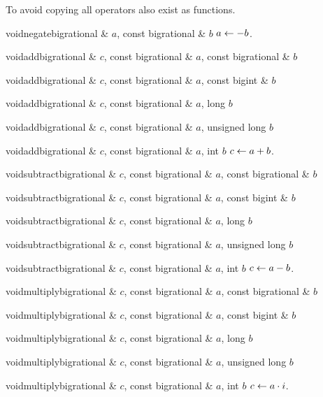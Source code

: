 To avoid copying all operators also exist as functions.

\begin{fcode}{void}{negate}{bigrational & $a$, const bigrational & $b$}
  $a \leftarrow -b$.
\end{fcode}

\begin{fcode}{void}{add}{bigrational & $c$, const bigrational & $a$, const bigrational & $b$}\end{fcode}
\begin{fcode}{void}{add}{bigrational & $c$, const bigrational & $a$, const bigint & $b$}\end{fcode}
\begin{fcode}{void}{add}{bigrational & $c$, const bigrational & $a$, long $b$}\end{fcode}
\begin{fcode}{void}{add}{bigrational & $c$, const bigrational & $a$, unsigned long $b$}\end{fcode}
\begin{fcode}{void}{add}{bigrational & $c$, const bigrational & $a$, int $b$}
  $c \leftarrow a + b$.
\end{fcode}

\begin{fcode}{void}{subtract}{bigrational & $c$, const bigrational & $a$, const bigrational & $b$}\end{fcode}
\begin{fcode}{void}{subtract}{bigrational & $c$, const bigrational & $a$, const bigint & $b$}\end{fcode}
\begin{fcode}{void}{subtract}{bigrational & $c$, const bigrational & $a$, long $b$}\end{fcode}
\begin{fcode}{void}{subtract}{bigrational & $c$, const bigrational & $a$, unsigned long $b$}\end{fcode}
\begin{fcode}{void}{subtract}{bigrational & $c$, const bigrational & $a$, int $b$}
  $c \leftarrow a - b$.
\end{fcode}

\begin{fcode}{void}{multiply}{bigrational & $c$, const bigrational & $a$, const bigrational & $b$}\end{fcode}
\begin{fcode}{void}{multiply}{bigrational & $c$, const bigrational & $a$, const bigint & $b$}\end{fcode}
\begin{fcode}{void}{multiply}{bigrational & $c$, const bigrational & $a$, long $b$}\end{fcode}
\begin{fcode}{void}{multiply}{bigrational & $c$, const bigrational & $a$, unsigned long $b$}\end{fcode}
\begin{fcode}{void}{multiply}{bigrational & $c$, const bigrational & $a$, int $b$}
  $c \leftarrow a \cdot i$.
\end{fcode}

